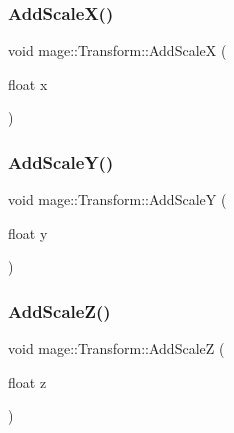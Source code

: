\hypertarget{structmage_1_1_transform_afb49f4e4ca1772f8ed38465afcf414a0}{}\label{structmage_1_1_transform_afb49f4e4ca1772f8ed38465afcf414a0} 
\subsubsection{\texorpdfstring{Add\+Scale\+X()}{AddScaleX()}}
{\footnotesize\ttfamily void mage\+::\+Transform\+::\+Add\+ScaleX (\begin{DoxyParamCaption}\item[{float}]{x }\end{DoxyParamCaption})}

\hypertarget{structmage_1_1_transform_ae3213b5cc2b347236783389c1b717356}{}\label{structmage_1_1_transform_ae3213b5cc2b347236783389c1b717356} 
\subsubsection{\texorpdfstring{Add\+Scale\+Y()}{AddScaleY()}}
{\footnotesize\ttfamily void mage\+::\+Transform\+::\+Add\+ScaleY (\begin{DoxyParamCaption}\item[{float}]{y }\end{DoxyParamCaption})}

\hypertarget{structmage_1_1_transform_aa493f3a588376d094ce50dfcffe0ece2}{}\label{structmage_1_1_transform_aa493f3a588376d094ce50dfcffe0ece2} 
\subsubsection{\texorpdfstring{Add\+Scale\+Z()}{AddScaleZ()}}
{\footnotesize\ttfamily void mage\+::\+Transform\+::\+Add\+ScaleZ (\begin{DoxyParamCaption}\item[{float}]{z }\end{DoxyParamCaption})}

\hypertarget{structmage_1_1_transform_a2e981e670eea4d731bda4ee68f0b7fae}{}\label{structmage_1_1_transform_a2e981e670eea4d731bda4ee68f0b7fae} 
